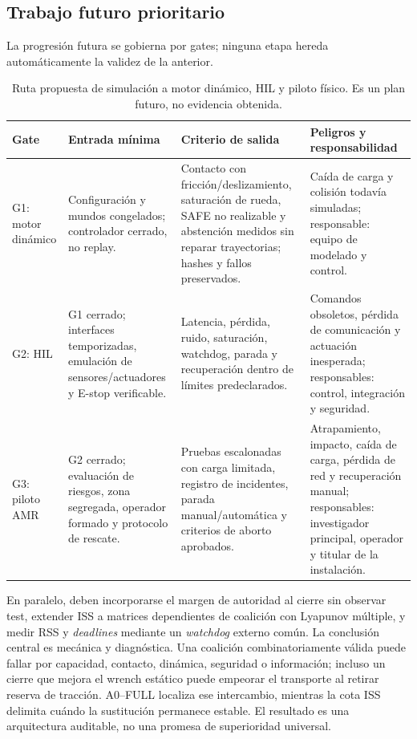\subsection*{Trabajo futuro prioritario}

La progresión futura se gobierna por gates; ninguna etapa hereda automáticamente la
validez de la anterior.

\begin{table}[H]
\centering
\scriptsize
\begin{tabularx}{\textwidth}{@{}p{}p{}p{}X@{}}
\toprule
Gate & Entrada mínima & Criterio de salida & Peligros y responsabilidad \\
\midrule
G1: motor dinámico & Configuración y mundos congelados; controlador cerrado, no replay. & Contacto con fricción/deslizamiento, saturación de rueda, SAFE no realizable y abstención medidos sin reparar trayectorias; hashes y fallos preservados. & Caída de carga y colisión todavía simuladas; responsable: equipo de modelado y control. \\
G2: HIL & G1 cerrado; interfaces temporizadas, emulación de sensores/actuadores y E-stop verificable. & Latencia, pérdida, ruido, saturación, watchdog, parada y recuperación dentro de límites predeclarados. & Comandos obsoletos, pérdida de comunicación y actuación inesperada; responsables: control, integración y seguridad. \\
G3: piloto AMR & G2 cerrado; evaluación de riesgos, zona segregada, operador formado y protocolo de rescate. & Pruebas escalonadas con carga limitada, registro de incidentes, parada manual/automática y criterios de aborto aprobados. & Atrapamiento, impacto, caída de carga, pérdida de red y recuperación manual; responsables: investigador principal, operador y titular de la instalación. \\
\bottomrule
\end{tabularx}
\caption{Ruta propuesta de simulación a motor dinámico, HIL y piloto físico. Es un plan futuro, no evidencia obtenida.}
\label{tab:gates-validacion-futura}
\end{table}

En paralelo, deben incorporarse el margen de autoridad al cierre sin observar test,
extender ISS a matrices dependientes de coalición con Lyapunov múltiple, y medir RSS y
\emph{deadlines} mediante un \emph{watchdog} externo común.
La conclusión central es mecánica y diagnóstica. Una coalición combinatoriamente válida puede fallar por capacidad, contacto, dinámica, seguridad o información; incluso un cierre que mejora el wrench estático puede empeorar el transporte al retirar reserva de tracción. A0--FULL localiza ese intercambio, mientras la cota ISS delimita cuándo la sustitución permanece estable. El resultado es una arquitectura auditable, no una promesa de superioridad universal.
